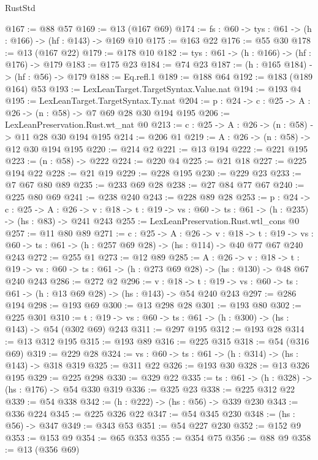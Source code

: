 \begin{lexlean}{RustStd}
\begin{coremodule}
@167 := @88 @57
@169 := @13 (@167 @69)
@174 := {fs : @60} -> {tys : @61} -> (h : @166) -> (hf : @143) -> @169 @10
@175 := @163 @22
@176 := @55 @30
@178 := @13 (@167 @22)
@179 := @178 @10
@182 := {tys : @61} -> (h : @166) -> (hf : @176) -> @179
@183 := @175 @23
@184 := @74 @23
@187 := (h : @165 @184) -> (hf : @56) -> @179
@188 := Eq.refl.{1}
@189 := @188 @64
@192 := @183 (@189 @164) @53
@193 := LexLeanTarget.TargetSyntax.Value.nat
@194 := @193 @4
@195 := LexLeanTarget.TargetSyntax.Ty.nat
@204 := {p : @24} -> {c : @25} -> {A : @26} -> (n : @58) -> @7 @69 @28 @30 @194 @195
@206 := LexLeanPreservation.Rust.wt_nat @0
@213 := {c : @25} -> {A : @26} -> (n : @58) -> @11 @28 @30 @194 @195
@214 := @206 @1
@219 := {A : @26} -> (n : @58) -> @12 @30 @194 @195
@220 := @214 @2
@221 := @13 @194
@222 := @221 @195
@223 := (n : @58) -> @222
@224 := @220 @4
@225 := @21 @18
@227 := @225 @194 @22
@228 := @21 @19
@229 := @228 @195
@230 := @229 @23
@233 := @7 @67 @80 @89
@235 := @233 @69 @28
@238 := @27 @84 @77 @67
@240 := @225 @80 @69
@241 := @238 @240
@243 := @228 @89 @28
@253 := {p : @24} ->
  {c : @25} ->
  {A : @26} ->
  {v : @18} -> {t : @19} -> {vs : @60} -> {ts : @61} -> (h : @235) -> (hs : @83) -> @241 @243
@255 := LexLeanPreservation.Rust.wtl_cons @0
@257 := @11 @80 @89
@271 := {c : @25} ->
  {A : @26} ->
  {v : @18} ->
  {t : @19} ->
  {vs : @60} -> {ts : @61} -> (h : @257 @69 @28) -> (hs : @114) -> @40 @77 @67 @240 @243
@272 := @255 @1
@273 := @12 @89
@285 := {A : @26} ->
  {v : @18} ->
  {t : @19} -> {vs : @60} -> {ts : @61} -> (h : @273 @69 @28) -> (hs : @130) -> @48 @67 @240 @243
@286 := @272 @2
@296 := {v : @18} ->
  {t : @19} -> {vs : @60} -> {ts : @61} -> (h : @13 @69 @28) -> (hs : @143) -> @54 @240 @243
@297 := @286 @194
@298 := @193 @69
@300 := @13 @298 @28
@301 := @193 @80
@302 := @225 @301
@310 := {t : @19} -> {vs : @60} -> {ts : @61} -> (h : @300) -> (hs : @143) -> @54 (@302 @69) @243
@311 := @297 @195
@312 := @193 @28
@314 := @13 @312 @195
@315 := @193 @89
@316 := @225 @315
@318 := @54 (@316 @69)
@319 := @229 @28
@324 := {vs : @60} -> {ts : @61} -> (h : @314) -> (hs : @143) -> @318 @319
@325 := @311 @22
@326 := @193 @30
@328 := @13 @326 @195
@329 := @225 @298
@330 := @329 @22
@335 := {ts : @61} -> (h : @328) -> (hs : @176) -> @54 @330 @319
@336 := @325 @23
@338 := @225 @312 @22
@339 := @54 @338
@342 := (h : @222) -> (hs : @56) -> @339 @230
@343 := @336 @224
@345 := @225 @326 @22
@347 := @54 @345 @230
@348 := (hs : @56) -> @347
@349 := @343 @53
@351 := @54 @227 @230
@352 := @152 @9
@353 := @153 @9
@354 := @65 @353
@355 := @354 @75
@356 := @88 @9
@358 := @13 (@356 @69)

\end{coremodule}
\end{lexlean}
